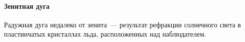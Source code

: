 



\paragraph{Зенитная дуга}

Радужная дуга недалеко от зенита~--- результат рефракции солнечного света в пластинчатых кристаллах льда, расположенных над наблюдателем. 


